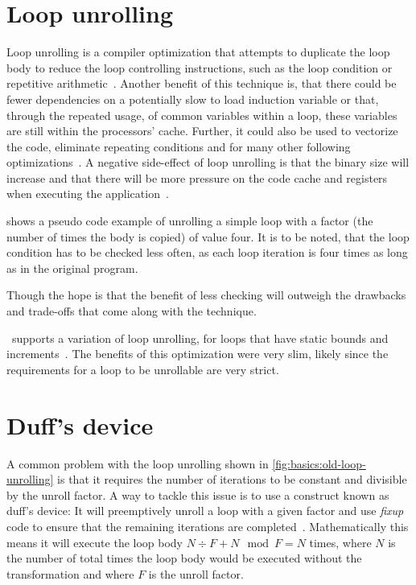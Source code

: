 \section{Loop unrolling}\label{sec:basics:unrolling}

Loop unrolling is a compiler optimization that attempts to duplicate the loop body to reduce the loop controlling instructions, such as the loop condition or repetitive arithmetic~\cite{aho_ullman_1979}.
Another benefit of this technique is, that there could be fewer dependencies on a potentially slow to load induction variable or that, through the repeated usage, of common variables within a loop, these variables are still within the processors' cache.
Further, it could also be used to vectorize the code, eliminate repeating conditions and for many other following optimizations~\cite{fog_2018}.
A negative side-effect of loop unrolling is that the binary size will increase and that there will be more pressure on the code cache and registers when executing the application~\cite{Sarkar2001}.

 shows a pseudo code example of unrolling a simple loop with a factor (the number of times the body is copied) of value four.
It is to be noted, that the loop condition has to be checked less often, as each loop iteration is four times as long as in the original program.

Though the hope is that the benefit of less checking will outweigh the drawbacks and trade-offs that come along with the technique.

\libFIRM~supports a variation of loop unrolling, for loops that have static bounds and increments~\cite{aebi18bachelorarbeit}.
The benefits of this optimization were very slim, likely since the requirements for a loop to be unrollable are very strict.




\section{Duff's device}\label{sec:basics:duffs}

A common problem with the loop unrolling shown in \cref{fig:basics:old-loop-unrolling} is that it requires the number of iterations to be constant and divisible by the unroll factor.
A way to tackle this issue is to use a construct known as duff's device: It will preemptively unroll a loop with a given factor and use \textit{fixup} code to ensure that the remaining iterations are completed~\cite{duff_1983}.
Mathematically this means it will execute the loop body $N \div F + N \mod F = N$ times, where $N$ is the number of total times the loop body would be executed without the transformation and where $F$ is the unroll factor.

